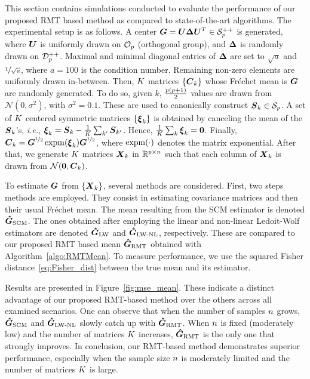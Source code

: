 \documentclass{article}
\theoremstyle{plain}
\theoremstyle{definition}
\theoremstyle{remark}
\begin{document}
This section contains simulations conducted to evaluate the performance of our proposed RMT based method as compared to state-of-the-art algorithms.
%
The experimental setup is as follows.
A center $\boldsymbol{G}=\boldsymbol{U}\boldsymbol{\Delta}\boldsymbol{U}^T\in\mathcal{S}^{++}_{p}$ is generated, where $\boldsymbol{U}$ is uniformly drawn on $\mathcal{O}_{p}$ (orthogonal group), and $\boldsymbol{\Delta}$ is randomly drawn on $\mathcal{D}^{++}_{p}$.
Maximal and minimal diagonal entries of $\boldsymbol{\Delta}$ are set to $\sqrt{a}$ and $\nicefrac{1}{\sqrt{a}}$, where $a=100$ is the condition number.
Remaining non-zero elements are uniformly drawn in-between.
%
Then, $K$ matrices $\{\boldsymbol{C}_k\}$ whose Fréchet mean is $\boldsymbol{G}$ are randomly generated.
To do so, given $k$, $\frac{p(p+1)}{2}$ values are drawn from $\mathcal{N}(0,\sigma^2)$, with $\sigma^2=0.1$.
These are used to canonically construct $\boldsymbol{S}_k\in\mathcal{S}_{p}$.
A set of $K$ centered symmetric matrices $\{\boldsymbol{\xi}_k\}$ is obtained by canceling the mean of the $\boldsymbol{S}_k$'s, \emph{i.e.}, $\boldsymbol{\xi}_k = \boldsymbol{S}_k - \frac1{K}\sum_{k'}\boldsymbol{S}_{k'}$.
Hence, $\frac1{K}\sum_k\boldsymbol{\xi}_k=\boldsymbol{0}$.
Finally, $\boldsymbol{C}_k=\boldsymbol{G}^{\nicefrac12}\operatorname{expm}(\boldsymbol{\xi}_k)\boldsymbol{G}^{\nicefrac12}$, where $\operatorname{expm}(\cdot)$ denotes the matrix exponential.
%
After that, we generate $K$ matrices $\boldsymbol{X}_k$ in $\mathbb{R}^{p\times n}$ such that each column of $\boldsymbol{X}_k$ is drawn from $\mathcal{N}(\boldsymbol{0},\boldsymbol{C}_k)$.

To estimate $\boldsymbol{G}$ from $\{\boldsymbol{X}_k\}$, several methods are considered.
First, two steps methods are employed.
They consist in estimating covariance matrices and then their usual Fréchet mean.
The mean resulting from the SCM estimator is denoted $\boldsymbol{\hat{G}}_{\textup{SCM}}$.
The ones obtained after employing the linear and non-linear Ledoit-Wolf estimators are denoted $\boldsymbol{\hat{G}}_{\textup{LW}}$ and $\boldsymbol{\hat{G}}_{\textup{LW-NL}}$, respectively.
These are compared to our proposed RMT based mean $\boldsymbol{\hat{G}}_{\textup{RMT}}$ obtained with Algorithm~\ref{algo:RMTMean}.
To measure performance, we use the squared Fisher distance~\eqref{eq:Fisher_dist} between the true mean and its estimator.

Results are presented in Figure~\ref{fig:mse_mean}.
These indicate a distinct advantage of our proposed RMT-based method over the others across all examined scenarios.
One can observe that when the number of samples $n$ grows, $\boldsymbol{\hat{G}}_{\textup{SCM}}$ and $\boldsymbol{\hat{G}}_{\textup{LW-NL}}$ slowly catch up with $\boldsymbol{\hat{G}}_{\textup{RMT}}$.
When $n$ is fixed (moderately low) and the number of matrices $K$ increases, $\boldsymbol{\hat{G}}_{\textup{RMT}}$ is the only one that strongly improves.
%
In conclusion, our RMT-based method demonstrates superior performance, especially when the sample size $n$ is moderately limited and the number of matrices $K$ is large.
\end{document}
